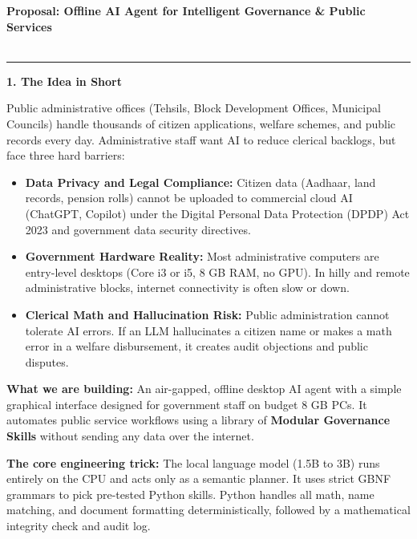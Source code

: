 \documentclass[11pt,a4paper]{article}
\begin{document}
\noindent\textbf{\large Proposal: Offline AI Agent for Intelligent Governance \& Public Services}\\[0.05cm]
\\[0.06cm]
\hrule
\vspace{0.18cm}

\noindent\textbf{\large 1. The Idea in Short}

\vspace{0.1cm}
\noindent
Public administrative offices (Tehsils, Block Development Offices, Municipal Councils) handle thousands of citizen applications, welfare schemes, and public records every day. Administrative staff want AI to reduce clerical backlogs, but face three hard barriers:
\begin{itemize}[leftmargin=*, itemsep=1.5pt, topsep=2pt]
    \item \textbf{Data Privacy and Legal Compliance:} Citizen data (Aadhaar, land records, pension rolls) cannot be uploaded to commercial cloud AI (ChatGPT, Copilot) under the Digital Personal Data Protection (DPDP) Act 2023 and government data security directives.
    \item \textbf{Government Hardware Reality:} Most administrative computers are entry-level desktops (Core i3 or i5, 8 GB RAM, no GPU). In hilly and remote administrative blocks, internet connectivity is often slow or down.
    \item \textbf{Clerical Math and Hallucination Risk:} Public administration cannot tolerate AI errors. If an LLM hallucinates a citizen name or makes a math error in a welfare disbursement, it creates audit objections and public disputes.
\end{itemize}

\vspace{0.08cm}
\noindent
\textbf{What we are building:} An air-gapped, offline desktop AI agent with a simple graphical interface designed for government staff on budget 8 GB PCs. It automates public service workflows using a library of \textbf{Modular Governance Skills} without sending any data over the internet.

\noindent
\textbf{The core engineering trick:} The local language model (1.5B to 3B) runs entirely on the CPU and acts only as a semantic planner. It uses strict GBNF grammars to pick pre-tested Python skills. Python handles all math, name matching, and document formatting deterministically, followed by a mathematical integrity check and audit log.
\end{document}
